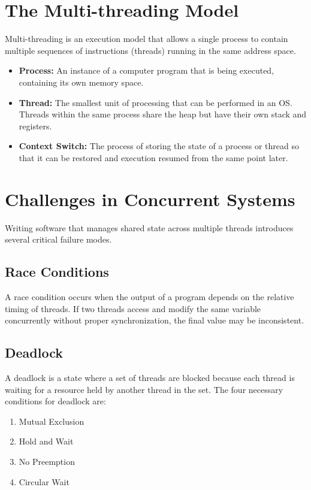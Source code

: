 \documentclass{article}
\begin{document}
\section{The Multi-threading Model}
Multi-threading is an execution model that allows a single process to contain multiple sequences of instructions (threads) running in the same address space.

\begin{itemize}
  \item \textbf{Process:} An instance of a computer program that is being executed, containing its own memory space.
  \item \textbf{Thread:} The smallest unit of processing that can be performed in an OS. Threads within the same process share the heap but have their own stack and registers.
  \item \textbf{Context Switch:} The process of storing the state of a process or thread so that it can be restored and execution resumed from the same point later.
\end{itemize}

\section{Challenges in Concurrent Systems}
Writing software that manages shared state across multiple threads introduces several critical failure modes.

\subsection{Race Conditions}
A race condition occurs when the output of a program depends on the relative timing of threads. If two threads access and modify the same variable concurrently without proper synchronization, the final value may be inconsistent.

\subsection{Deadlock}
A deadlock is a state where a set of threads are blocked because each thread is waiting for a resource held by another thread in the set. The four necessary conditions for deadlock are:
\begin{enumerate}
  \item Mutual Exclusion
  \item Hold and Wait
  \item No Preemption
  \item Circular Wait
\end{enumerate}
\end{document}
